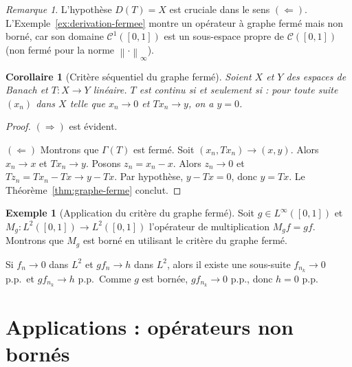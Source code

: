 \documentclass[a4paper,12pt]{book}
\newcommand{\norm}[1]{\left\| #1 \right\|}
\theoremstyle{definition}
\newtheorem{exemple}[definition]{Exemple}
\theoremstyle{plain}
\newtheorem{corollaire}[definition]{Corollaire}
\theoremstyle{remark}
\newtheorem{remarque}[definition]{Remarque}
\begin{document}
\begin{remarque}
\label{rem:graphe-ferme-domaine}
L'hypothèse $D(T) = X$ est cruciale dans le sens $(\Leftarrow)$.
L'Exemple~\ref{ex:derivation-fermee} montre un opérateur à graphe fermé
mais non borné, car son domaine $\mathcal{C}^1([0,1])$ est un sous-espace
propre de $\mathcal{C}([0,1])$ (non fermé pour la norme $\norm{\cdot}_\infty$).
\end{remarque}

\begin{corollaire}[Critère séquentiel du graphe fermé]
\label{cor:critere-graphe-ferme}
Soient $X$ et $Y$ des espaces de Banach et $T : X \to Y$ linéaire.
$T$ est continu si et seulement si : pour toute suite $(x_n)$ dans $X$
telle que $x_n \to 0$ et $Tx_n \to y$, on a $y = 0$.
\end{corollaire}

\begin{proof}
$(\Rightarrow)$ est évident.

$(\Leftarrow)$ Montrons que $\Gamma(T)$ est fermé. Soit $(x_n, Tx_n) \to (x,y)$.
Alors $x_n \to x$ et $Tx_n \to y$. Posons $z_n = x_n - x$. Alors $z_n \to 0$
et $Tz_n = Tx_n - Tx \to y - Tx$. Par hypothèse, $y - Tx = 0$, donc $y = Tx$.
Le Théorème~\ref{thm:graphe-ferme} conclut.
\end{proof}

\begin{exemple}[Application du critère du graphe fermé]
\label{ex:application-critere}
Soit $g \in L^\infty([0,1])$ et $M_g : L^2([0,1]) \to L^2([0,1])$
l'opérateur de multiplication $M_g f = gf$. Montrons que $M_g$ est borné
en utilisant le critère du graphe fermé.

Si $f_n \to 0$ dans $L^2$ et $gf_n \to h$ dans $L^2$, alors il existe une
sous-suite $f_{n_k} \to 0$ p.p.\ et $gf_{n_k} \to h$ p.p.\ Comme $g$ est
bornée, $gf_{n_k} \to 0$ p.p., donc $h = 0$ p.p.
\end{exemple}


\section{Applications : opérateurs non bornés}
\label{sec:operateurs-non-bornes}

\end{document}
